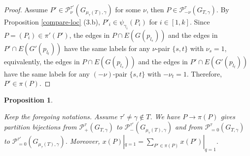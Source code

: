 \documentclass[10pt]{amsart}
\theoremstyle{theorems}
\newtheorem{Proposition}[Theorem]{Proposition}
\begin{document}
\begin{proof}

Assume $P'\in \mathcal P^{\tau'}_{\nu}(G_{\mu_{\tau}(T),\gamma})$ for some $\nu$, then $P\in \mathcal P^{\tau}_{-\nu}(G_{T,\gamma})$. By Proposition \ref{compare-loc} (3.b), $P'_i\in \psi_{\gamma_i}(P_i)$ for $i\in [1,k]$. Since $P=(P_i)\in \pi'(P')$, the edges in $P\cap E(G(p_{l_s}))$ and the edges in $P'\cap E(G'(p_{l_t}))$ have the same labels for any $\nu$-pair $\{s,t\}$ with $\nu_s=1$, equivalently, the edges in $P\cap E(G(p_{l_s}))$ and the edges in $P'\cap E(G'(p_{l_t}))$ have the same labels for any $(-\nu)$-pair $\{s,t\}$ with $-\nu_t=1$. Therefore, $P'\in \pi(P)$.
\end{proof}

\medskip

\begin{Proposition}\label{partition1}

Keep the foregoing notations. Assume $\tau'\neq \gamma \notin T$. We have $P\rightarrow \pi(P)$ gives partition bijections from $\mathcal P^{\tau}_{+}(G_{T,\gamma})$ to $\mathcal P^{\tau'}_{-}(G_{\mu_{\tau}(T),\gamma})$ and from $\mathcal P^{\tau}_{=0}(G_{T,\gamma})$ to $\mathcal P^{\tau'}_{=0}(G_{\mu_{\tau}(T),\gamma})$. Moreover, $x(P)|_{q=1}=\sum_{P'\in \pi(P)}x(P')|_{q=1}$.

\end{Proposition}
\end{document}
